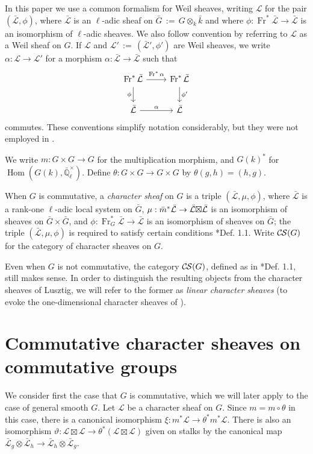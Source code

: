 \documentclass[10pt]{amsart}
\theoremstyle{plain}
\theoremstyle{definition}
\newcommand{\EE}{\mathbb{\bar Q}_\ell}
\newcommand{\bFq}{\bar{k}}
\newcommand{\Fq}{k}
\newcommand{\EEx}{\EE^\times}
\newcommand{\Frob}[1]{\operatorname{Fr}_{#1}}
\DeclareMathOperator{\Hom}{Hom}
\newcommand{\ceq}{{\, :=\, }}
\newcommand{\cs}[1]{{\mathcal{#1}}}
\newcommand{\gcs}[1]{{\mathcal{\bar #1}}}
\newcommand{\CS}{{\mathcal{C\hskip-0.8pt S}}}
\newcommand{\bm}{\bar{m}}
\newcommand{\bG}{\bar{G}}
\newcommand{\tight}[3]{\hspace{-#1pt}{#2}\hspace{-#3pt}}
\newcommand{\LxL}{\text{$\gcs{L} \tight{0}{\boxtimes}{0} \gcs{L}$}}
\begin{document}
In this paper we use a common formalism for Weil sheaves, writing $\cs{L}$ for the pair $(\gcs{L},\phi)$, where $\gcs{L}$ is an $\ell$-adic sheaf on $\bG \ceq G\otimes_{\Fq} \bFq$ and where $\phi : \Frob{}^*\gcs{L} \to \gcs{L}$ is an isomorphism of $\ell$-adic sheaves. 
We also follow convention by referring to $\cs{L}$  as a Weil sheaf on $G$. 
If $\cs{L}$ and $\cs{L}' \ceq (\gcs{L}', \phi')$ are Weil sheaves, we write $\alpha : \cs{L} \to \cs{L}'$ for a morphism $\alpha : \gcs{L} \to \gcs{L}$ such that 
\[
\begin{tikzcd}
\Frob{}^* \gcs{L} \arrow{d}[swap]{\phi} \arrow{r}{\Frob{}^*\alpha} &  \Frob{}^* \gcs{L} \arrow{d}{\phi'}\\
\gcs{L} \arrow{r}{\alpha} & \gcs{L}
\end{tikzcd}
\]
commutes.  
These conventions simplify notation considerably, but they were not employed in \cite{cunningham-roe:13a}.

We write $m : G \times G \to G$ for the multiplication morphism, and $G(k)^*$ for $\Hom(G(k), \EEx)$.
Define $\theta : G\times G \to G\times G$ by $\theta(g,h) = (h,g)$.

When $G$ is commutative, a \emph{character sheaf} on $G$ is a triple $(\gcs{L}, \mu, \phi)$,
where $\gcs{L}$ is a rank-one $\ell$-adic local system on $\bG$, 
$\mu : \bm^* \gcs{L} \to \LxL$ is an isomorphism
of sheaves on $\bG \times \bG$, 
and $\phi : \Frob{G}^* \gcs{L} \to \gcs{L}$ is an isomorphism of sheaves on $\bG$;
the triple $(\gcs{L}, \mu, \phi)$ is required to satisfy certain conditions \cite{cunningham-roe:13a}*{Def. 1.1}.
Write $\CS(G)$ for the category of character sheaves on $G$.

Even when $G$ is not commutative, the category $\CS(G)$, defined as in \cite{cunningham-roe:13a}*{Def. 1.1},
still makes sense.  In order to distinguish the resulting objects from
the character sheaves of Lusztig, we will refer to the former as \emph{linear character sheaves}
(to evoke the one-dimensional character sheaves of \cite{kamgarpour:09a}).

\section{Commutative character sheaves on commutative groups}\label{sec:comcom}

We consider first the case that $G$ is commutative, which we will later apply to the case of general smooth $G$.
Let $\cs{L}$ be a character sheaf on $G$.  Since $m = m \circ \theta$ in this case,
there is a canonical isomorphism $\xi : m^* \cs{L} \to \theta^* m^* \cs{L}$.
There is also an isomorphism $\vartheta : \cs{L}\boxtimes\cs{L} \to \theta^*(\cs{L}\boxtimes\cs{L})$
given on stalks by the canonical map $\gcs{L}_{g} \otimes \gcs{L}_{h} \to \gcs{L}_{h} \otimes \gcs{L}_{g}$.
\end{document}
